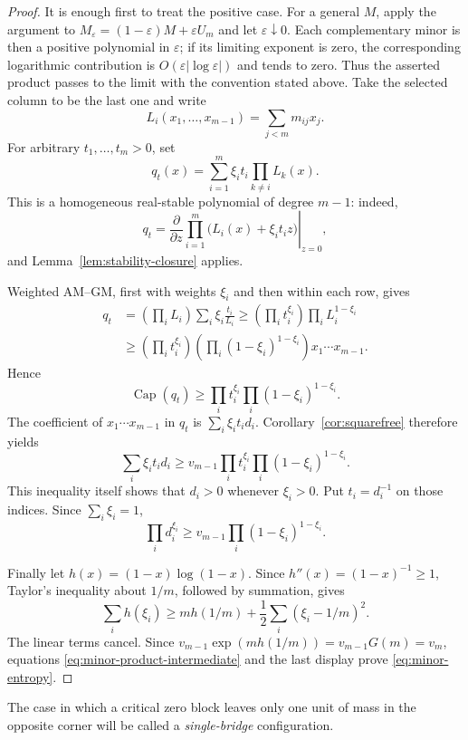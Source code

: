 \documentclass[11pt]{article}
\theoremstyle{definition}
\newcommand{\pcap}{\operatorname{Cap}}
\newcommand{\1}{\mathbf{1}}
\newcommand{\eps}{\varepsilon}
\begin{document}
\begin{proof}
It is enough first to treat the positive case.  For a general $M$, apply
the argument to $M_\eps=(1-\eps)M+\eps U_m$ and let $\eps\downarrow0$.
Each complementary minor is then a positive polynomial in $\eps$; if its
limiting exponent is zero, the corresponding logarithmic contribution is
$O(\eps|\log\eps|)$ and tends to zero.  Thus the asserted product passes
to the limit with the convention stated above.  Take the selected column to
be the last one and write
\[
 L_i(x_1,\dots,x_{m-1})=\sum_{j<m}m_{ij}x_j.
\]
For arbitrary $t_1,\dots,t_m>0$, set
\[
 q_t(x)=\sum_{i=1}^m\xi_i t_i\prod_{k\ne i}L_k(x).
\]
This is a homogeneous real-stable polynomial of degree $m-1$: indeed,
\[
 q_t=
 \left.
 \frac{\partial}{\partial z}
 \prod_{i=1}^m\bigl(L_i(x)+\xi_i t_i z\bigr)
 \right|_{z=0},
\]
and Lemma~\ref{lem:stability-closure} applies.

Weighted AM--GM, first with weights $\xi_i$ and then within each row, gives
\[
 \begin{aligned}
 q_t
 &=\left(\prod_iL_i\right)
   \sum_i\xi_i\frac{t_i}{L_i}
 \ge \left(\prod_i t_i^{\xi_i}\right)
      \prod_iL_i^{1-\xi_i}\\
 &\ge
 \left(\prod_i t_i^{\xi_i}\right)
 \left(\prod_i(1-\xi_i)^{1-\xi_i}\right)
 x_1\cdots x_{m-1}.
 \end{aligned}
\]
Hence
\[
 \pcap(q_t)\ge
 \prod_i t_i^{\xi_i}
 \prod_i(1-\xi_i)^{1-\xi_i}.
\]
The coefficient of $x_1\cdots x_{m-1}$ in $q_t$ is
$\sum_i\xi_i t_i d_i$.  Corollary~\ref{cor:squarefree} therefore yields
\[
 \sum_i\xi_i t_i d_i
 \ge
 v_{m-1}
 \prod_i t_i^{\xi_i}
 \prod_i(1-\xi_i)^{1-\xi_i}.
 \tag{3.13}\label{eq:weighted-minor-pre}
\]
This inequality itself shows that $d_i>0$ whenever $\xi_i>0$.  Put
$t_i=d_i^{-1}$ on those indices.  Since $\sum_i\xi_i=1$,
\[
 \prod_i d_i^{\xi_i}
 \ge
 v_{m-1}\prod_i(1-\xi_i)^{1-\xi_i}.
 \tag{3.14}\label{eq:minor-product-intermediate}
\]

Finally let $h(x)=(1-x)\log(1-x)$.  Since $h''(x)=(1-x)^{-1}\ge1$,
Taylor's inequality about $1/m$, followed by summation, gives
\[
 \sum_i h(\xi_i)
 \ge mh(1/m)+\frac12\sum_i(\xi_i-1/m)^2.
\]
The linear terms cancel.  Since
$v_{m-1}\exp(mh(1/m))=v_{m-1}G(m)=v_m$, equations
\eqref{eq:minor-product-intermediate} and the last display prove
\eqref{eq:minor-entropy}.
\end{proof}

The case in which a critical zero block leaves only one unit of mass in the
opposite corner will be called a \emph{single-bridge} configuration.
\end{document}

